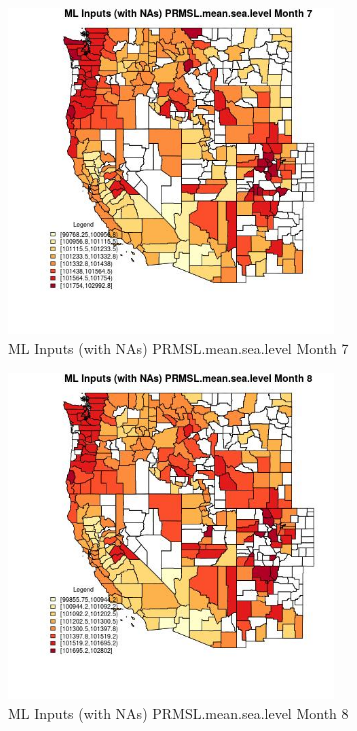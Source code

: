 \clearpage 

\begin{figure} 
\centering  
\includegraphics[width=0.77\textwidth]{Code_Outputs/Report_ML_input_PM25_Step4_part_e_de_duplicated_aves_compiled_2019-05-21wNAs_CountyPRMSLmeansealevelmedianMonth7.jpg} 
\caption{\label{fig:Report_ML_input_PM25_Step4_part_e_de_duplicated_aves_compiled_2019-05-21wNAsCountyPRMSLmeansealevelmedianMonth7}ML Inputs (with NAs) PRMSL.mean.sea.level Month 7} 
\end{figure} 
 

\begin{figure} 
\centering  
\includegraphics[width=0.77\textwidth]{Code_Outputs/Report_ML_input_PM25_Step4_part_e_de_duplicated_aves_compiled_2019-05-21wNAs_CountyPRMSLmeansealevelmedianMonth8.jpg} 
\caption{\label{fig:Report_ML_input_PM25_Step4_part_e_de_duplicated_aves_compiled_2019-05-21wNAsCountyPRMSLmeansealevelmedianMonth8}ML Inputs (with NAs) PRMSL.mean.sea.level Month 8} 
\end{figure} 
 

